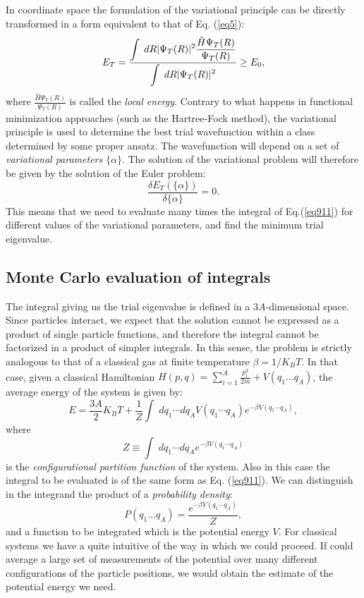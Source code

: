 In coordinate space the formulation of the variational principle can be directly
transformed in a form equivalent to that of Eq. (\ref{eq5}):
\begin{equation}
E_T=  \displaystyle\frac{\displaystyle\int\; dR \vert \Psi_T(R)\vert^2\displaystyle\displaystyle\frac{\hat{H}\Psi_T(R)}{ \Psi_T(R)}}{\displaystyle\int\; dR \vert \Psi_T(R) \vert^2}\geq E_0, \label{eq911}
\end{equation}
where $\frac{\hat{H}\Psi_T(R)}{ \Psi_T(R)}$ is called the {\it local energy}. 
Contrary to what happens in functional 
minimization approaches (such as the Hartree-Fock method), the variational 
principle is used to determine the best trial wavefunction within a class determined
by some proper ansatz. The wavefunction will depend on a set of 
{\it variational parameters} $\{\alpha\}$. The solution of the variational problem
will therefore be given by the solution of the Euler problem:
\begin{equation}
\frac{\delta E_T(\{\alpha \})}{\delta \{\alpha\}}=0.
\end{equation} 
This means that we need to evaluate many times the integral of Eq.(\ref{eq911}) for 
different values of the variational parameters, and find the minimum trial eigenvalue. 
\subsection{Monte Carlo evaluation of integrals}
The integral giving us the trial eigenvalue is defined in a $3A$-dimensional space. Since particles interact, we expect that the solution cannot be expressed as a product of single particle functions, and therefore the integral cannot be factorized in a product of simpler integrals. In this sense, the problem is strictly analogous to that of a classical gas at finite temperature $\beta=1/{K_B T}$. In that case, given a classical Hamiltonian $H(p,q)=\sum_{i=1}^{A}\frac{p_i^2}{2m}+V(q_1\dots q_A)$, the average energy of the system is given by:
\begin{equation}
E=\frac{3A}{2}K_B T+\frac{1}{Z}\int\;dq_1\cdots dq_A V(q_1\cdots q_A)e^{-\beta V(q_1\cdots q_A)},
\end{equation}
where 
\begin{equation}
Z\equiv\int\;dq_1\cdots dq_A e^{-\beta V(q_1\cdots q_A)}
\end{equation}
is the {\it configurational partition function} of the system. Also in this case the integral to be evaluated is of the same form as Eq. (\ref{eq911}). We can distinguish in the integrand the product of a {\it probability density}:
\begin{equation}
P(q_1\dots q_A)=\frac{e^{-\beta V(q_1\cdots q_A)}}{Z},
\end{equation}
and a function to be integrated which is the potential energy $V$. For classical systems we have a quite intuitive of the way in which we could proceed. If could average a large set of measurements of the potential over many different configurations of the particle positions, we would obtain the estimate of the potential energy we need. 

